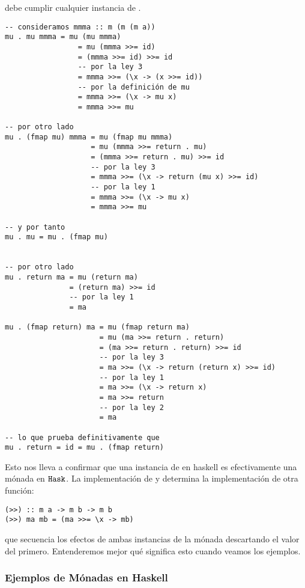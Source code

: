 debe cumplir cualquier instancia de .
\begin{verbatim}
-- consideramos mmma :: m (m (m a))
mu . mu mmma = mu (mu mmma)
                 = mu (mmma >>= id)
                 = (mmma >>= id) >>= id
                 -- por la ley 3
                 = mmma >>= (\x -> (x >>= id))
                 -- por la definición de mu
                 = mmma >>= (\x -> mu x)
                 = mmma >>= mu

-- por otro lado
mu . (fmap mu) mmma = mu (fmap mu mmma)
                    = mu (mmma >>= return . mu)
                    = (mmma >>= return . mu) >>= id
                    -- por la ley 3
                    = mmma >>= (\x -> return (mu x) >>= id)
                    -- por la ley 1
                    = mmma >>= (\x -> mu x)
                    = mmma >>= mu

-- y por tanto
mu . mu = mu . (fmap mu)


-- por otro lado
mu . return ma = mu (return ma)
               = (return ma) >>= id
               -- por la ley 1
               = ma

mu . (fmap return) ma = mu (fmap return ma)
                      = mu (ma >>= return . return)
                      = (ma >>= return . return) >>= id
                      -- por la ley 3
                      = ma >>= (\x -> return (return x) >>= id)
                      -- por la ley 1
                      = ma >>= (\x -> return x)
                      = ma >>= return
                      -- por la ley 2
                      = ma

-- lo que prueba definitivamente que
mu . return = id = mu . (fmap return)
\end{verbatim}
Esto nos lleva a confirmar que una instancia de  en haskell
es efectivamente una mónada en $\texttt{Hask}$. La implementación de
 y \cod{>{}>=} determina la implementación de otra
función:
\begin{verbatim}
(>>) :: m a -> m b -> m b
(>>) ma mb = (ma >>= \x -> mb)
\end{verbatim}
que secuencia los efectos de ambas instancias de la mónada descartando
el valor del primero. Entenderemos mejor qué significa esto cuando
veamos los ejemplos.

\subsubsection{Ejemplos de Mónadas en Haskell}
